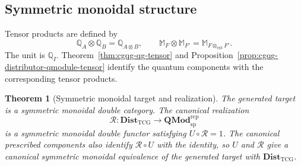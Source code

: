 \documentclass[oneside]{article}
\newcommand{\extprod}{\mathbin{\otimes_{\mathrm{ext}}}}
\theoremstyle{plain}
\newtheorem{theorem}{Theorem}[section]
\theoremstyle{definition}
\theoremstyle{remark}
\begin{document}
\subsection{Symmetric monoidal structure}
\label{subsec:cgqg-qmodule-double-tensor}

Tensor products are defined by
\[
 \mathbb Q_A\otimes\mathbb Q_B=\mathbb Q_{A\otimes B},
 \qquad
 \mathbb M_F\otimes\mathbb M_{F'}=\mathbb M_{F\extprod F'}.
\]
The unit is \(\mathbb Q_I\). Theorem~\ref{thm:cgqg-qg-tensor} and
Proposition~\ref{prop:cgqg-distributor-qmodule-tensor} identify the quantum
components with the corresponding tensor products.

\begin{theorem}[Symmetric monoidal target and realization]
\label{thm:cgqg-qmodule-symmetric-monoidal-double-category}
The generated target is a symmetric monoidal double category. The
canonical realization
\[
 \mathcal R:\mathbf{Dist}_{\mathrm{TCG}}
      \longrightarrow\mathbf{QMod}^{\mathrm{rep}}_{\mathrm{sp}}
\]
is a symmetric monoidal double functor satisfying \(U\circ\mathcal R=1\).
The canonical prescribed components also identify \(\mathcal R\circ U\)
with the identity, so \(U\) and \(\mathcal R\) give a canonical
symmetric monoidal equivalence of the generated target with
\(\mathbf{Dist}_{\mathrm{TCG}}\).
\end{theorem}
\end{document}
